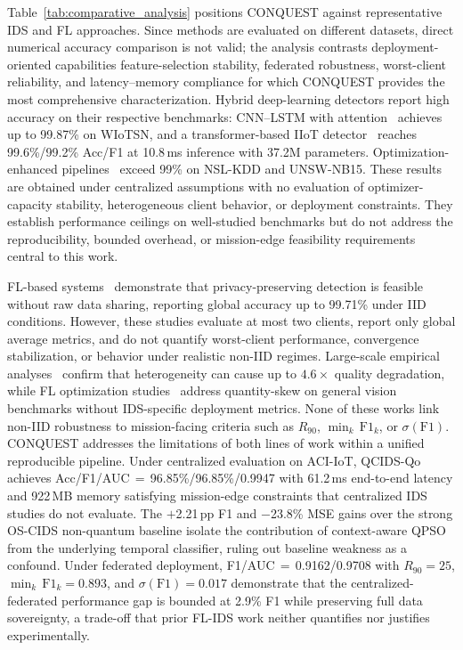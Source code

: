 \documentclass[conference]{IEEEtran}
\begin{document}
Table~\ref{tab:comparative_analysis} positions CONQUEST
against representative IDS and FL approaches. Since methods
are evaluated on different datasets, direct numerical accuracy
comparison is not valid; the analysis contrasts
deployment-oriented capabilities feature-selection stability,
federated robustness, worst-client reliability, and
latency--memory compliance for which CONQUEST provides the
most comprehensive characterization.
Hybrid deep-learning detectors report high accuracy on their
respective benchmarks: CNN--LSTM with
attention~\cite{phalaagaehybrid} achieves up to 99.87\% on
WIoTSN, and a transformer-based IIoT
detector~\cite{yuadaptive} reaches 99.6\%/99.2\% Acc/F1 at
10.8\,ms inference with 37.2M parameters.
Optimization-enhanced pipelines~\cite{donkoloptimization,shrivashybrid}
exceed 99\% on NSL-KDD and UNSW-NB15. These results are
obtained under centralized assumptions with no evaluation of
optimizer-capacity stability, heterogeneous client behavior,
or deployment constraints. They establish performance
ceilings on well-studied benchmarks but do not address the
reproducibility, bounded overhead, or mission-edge feasibility
requirements central to this work.

FL-based systems~\cite{FRIHA202217,herlambangfederated}
demonstrate that privacy-preserving detection is feasible
without raw data sharing, reporting global accuracy up to
99.71\% under IID conditions. However, these studies evaluate
at most two clients, report only global average metrics, and
do not quantify worst-client performance, convergence
stabilization, or behavior under realistic non-IID regimes.
Large-scale empirical analyses~\cite{abdelmoniemcomprehensive}
confirm that heterogeneity can cause up to $4.6\times$ quality
degradation, while FL optimization
studies~\cite{gefedamkd} address quantity-skew on general
vision benchmarks without IDS-specific deployment metrics.
None of these works link non-IID robustness to
mission-facing criteria such as $R_{90}$,
$\min_k\,\mathrm{F1}_k$, or $\sigma(\mathrm{F1})$.
CONQUEST addresses the limitations of both lines of work
within a unified reproducible pipeline. Under centralized
evaluation on ACI-IoT, QCIDS-Qo achieves
Acc/F1/AUC\,$=$\,96.85\%/96.85\%/0.9947 with 61.2\,ms
end-to-end latency and 922\,MB memory satisfying
mission-edge constraints that centralized IDS studies do not
evaluate. The $+$2.21\,pp F1 and $-$23.8\% MSE gains over
the strong OS-CIDS non-quantum baseline isolate the
contribution of context-aware QPSO from the underlying
temporal classifier, ruling out baseline weakness as a
confound. Under federated deployment,
F1/AUC\,$=$\,0.9162/0.9708 with $R_{90}{=}25$,
$\min_k\,\mathrm{F1}_k{=}0.893$, and
$\sigma(\mathrm{F1}){=}0.017$ demonstrate that the
centralized-federated performance gap is bounded at 2.9\%
F1 while preserving full data sovereignty, a trade-off that
prior FL-IDS work neither quantifies nor justifies
experimentally.
\end{document}
